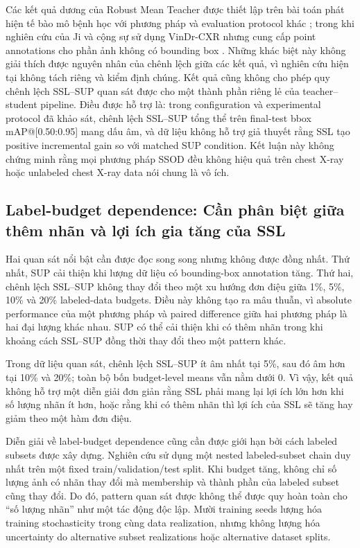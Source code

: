 \documentclass[pdflatex,sn-mathphys-num]{sn-jnl}%
\theoremstyle{thmstyleone}%
\theoremstyle{thmstyletwo}%
\theoremstyle{thmstylethree}%
\begin{document}
Các kết quả dương của Robust Mean Teacher được thiết lập trên bài toán phát hiện tế bào mô bệnh học với phương pháp và evaluation protocol khác \cite{wen2024robust}; trong khi nghiên cứu của Ji và cộng sự sử dụng VinDr-CXR nhưng cung cấp point annotations cho phần ảnh không có bounding box \cite{ji2022benchmark}. Những khác biệt này không giải thích được nguyên nhân của chênh lệch giữa các kết quả, vì nghiên cứu hiện tại không tách riêng và kiểm định chúng. Kết quả cũng không cho phép quy chênh lệch SSL--SUP quan sát được cho một thành phần riêng lẻ của teacher--student pipeline. Điều được hỗ trợ là: trong configuration và experimental protocol đã khảo sát, chênh lệch SSL--SUP tổng thể trên final-test bbox mAP@[0.50:0.95] mang dấu âm, và dữ liệu không hỗ trợ giả thuyết rằng SSL tạo positive incremental gain so với matched SUP condition. Kết luận này không chứng minh rằng mọi phương pháp SSOD đều không hiệu quả trên chest X-ray hoặc unlabeled chest X-ray data nói chung là vô ích.

\subsection{Label-budget dependence: Cần phân biệt giữa thêm nhãn và lợi ích gia tăng của SSL}

Hai quan sát nổi bật cần được đọc song song nhưng không được đồng nhất. Thứ nhất, SUP cải thiện khi lượng dữ liệu có bounding-box annotation tăng. Thứ hai, chênh lệch SSL--SUP không thay đổi theo một xu hướng đơn điệu giữa 1\%, 5\%, 10\% và 20\% labeled-data budgets. Điều này không tạo ra mâu thuẫn, vì absolute performance của một phương pháp và paired difference giữa hai phương pháp là hai đại lượng khác nhau. SUP có thể cải thiện khi có thêm nhãn trong khi khoảng cách SSL--SUP đồng thời thay đổi theo một pattern khác.

Trong dữ liệu quan sát, chênh lệch SSL--SUP ít âm nhất tại 5\%, sau đó âm hơn tại 10\% và 20\%; toàn bộ bốn budget-level means vẫn nằm dưới 0. Vì vậy, kết quả không hỗ trợ một diễn giải đơn giản rằng SSL phải mang lại lợi ích lớn hơn khi số lượng nhãn ít hơn, hoặc rằng khi có thêm nhãn thì lợi ích của SSL sẽ tăng hay giảm theo một hàm đơn điệu.

Diễn giải về label-budget dependence cũng cần được giới hạn bởi cách labeled subsets được xây dựng. Nghiên cứu sử dụng một nested labeled-subset chain duy nhất trên một fixed train/validation/test split. Khi budget tăng, không chỉ số lượng ảnh có nhãn thay đổi mà membership và thành phần của labeled subset cũng thay đổi. Do đó, pattern quan sát được không thể được quy hoàn toàn cho ``số lượng nhãn'' như một tác động độc lập. Mười training seeds lượng hóa training stochasticity trong cùng data realization, nhưng không lượng hóa uncertainty do alternative subset realizations hoặc alternative dataset splits.
\end{document}
